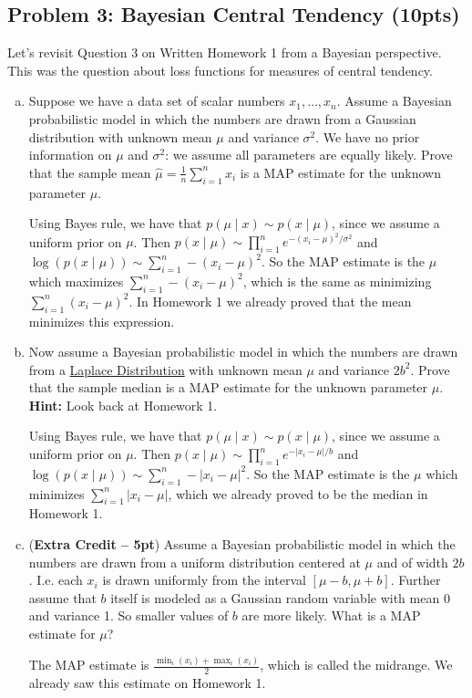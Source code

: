 \documentclass[10pt]{article}
\begin{document}
\subsection{Problem 3: Bayesian Central Tendency (10pts)}
Let's revisit Question 3 on Written Homework 1 from a Bayesian perspective. This was the question about loss functions for measures of central tendency. 
\begin{enumerate}[(a)]
	\item Suppose we have a data set of scalar numbers $x_1, \ldots, x_n$. Assume a Bayesian probabilistic model in which the numbers are drawn from a Gaussian distribution with unknown mean $\mu$ and variance $\sigma^2$. We have no prior information on $\mu$ and  $\sigma^2$: we assume all parameters are equally likely. Prove that the sample mean $\hat{\mu} = \frac{1}{n}\sum_{i=1}^n x_i$ is a MAP estimate for the unknown parameter $\mu$.
	
	\color{blue}
		Using Bayes rule, we have that $p(\mu \mid x) \sim p(x\mid \mu)$, since we assume a uniform prior on $\mu$. Then $p(x\mid \mu) \sim \prod_{i=1}^n e^{-(x_i-\mu)^2/\sigma^2}$ and $\log(p(x\mid \mu)) \sim \sum_{i=1}^n -(x_i-\mu)^2$. So the MAP estimate is the $\mu$ which maximizes $\sum_{i=1}^n -(x_i-\mu)^2$, which is the same as minimizing $\sum_{i=1}^n (x_i-\mu)^2$. In Homework 1 we already proved that the mean minimizes this expression.
	\color{black}
	
	\item Now assume a Bayesian probabilistic model in which the numbers are drawn from a \href{https://en.wikipedia.org/wiki/Laplace_distribution}{Laplace Distribution} with unknown mean $\mu$ and variance $2b^2$. Prove that the sample median is a MAP estimate for the unknown parameter $\mu$. \textbf{Hint:} Look back at Homework 1.
	
	\color{blue}
	Using Bayes rule, we have that $p(\mu \mid x) \sim p(x\mid \mu)$, since we assume a uniform prior on $\mu$. Then $p(x\mid \mu) \sim \prod_{i=1}^n e^{-|x_i-\mu|/b}$ and $\log(p(x\mid \mu)) \sim \sum_{i=1}^n -|x_i-\mu|^2$. So the MAP estimate is the $\mu$ which minimizes $\sum_{i=1}^n |x_i-\mu|$, which we already proved to be the median in Homework 1. 
	\color{black}
	
	\item (\textbf{Extra Credit -- 5pt}) Assume a Bayesian probabilistic model in which the numbers are drawn from a uniform distribution centered at $\mu$ and of width $2b$. I.e. each $x_i$ is drawn uniformly from the interval $[\mu-b, \mu + b]$. Further assume that $b$ itself is modeled as a Gaussian random variable with mean 0 and variance 1. So smaller values of $b$ are more likely. What is a MAP estimate for $\mu$?
	
	\color{blue}
	The MAP estimate is $\frac{\min_i(x_i) + \max_i(x_i)}{2}$, which is called the midrange. We already saw this estimate on Homework 1. 
	\color{black}
\end{enumerate}
\end{document}
